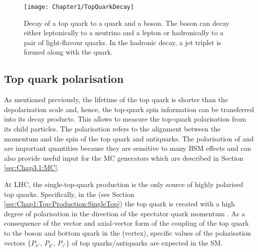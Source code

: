 \begin{figure}
    \centering
    \texttt{[image: Chapter1/TopQuarkDecay]}
    \caption{Decay of a top quark to a \Pbottom quark and a \PW boson. The \PW boson can 
    		decay either leptonically to a neutrino and a lepton
    		or hadronically to a pair of light-flavour quarks. In the hadronic \PW decay, 
		a jet triplet is formed along with the \Pbottom quark.}
    \label{fig:Chap1:top:decay:TopQuarkDecay}
\end{figure}



\subsection{Top quark polarisation}
\label{sec:Chap1:Top:Polarisation}
As mentioned previously, the lifetime of the top quark is shorter than the depolarisation scale
and, hence, the top-quark spin information can be transferred into its decay products. This
allows to measure the top-quark polarisation from its child particles. The polarisation refers to 
the alignment between the momentum and the spin of the top quark and antiquarks.
The polarisation of \Ptop and \APtop are important quantities because they are sensitive
to many BSM effects and can also provide useful input for the MC generators which are
described in Section \ref{sec:Chap3.1:MC}.

At LHC, the single-top-quark production is the only source of highly polarised top quarks.
Specifically, in the \tchannel (see Section \ref{sec:Chap1:Top:Production:SingleTop}) the top
quark is created with a high degree of polarisation in the direction of the spectator quark momentum \cite{Komm:2014fca}.
As a consequence of the vector and axial-vector
form of the coupling of the top quark to the \PW boson
and bottom quark in the \tchannel (\tWb vertex), specific
values of the polarisation vectors $\{P_{x'},\, P_{y'},\, P_{z'}\}$ of top
quarks/antiquarks are expected in the SM.


